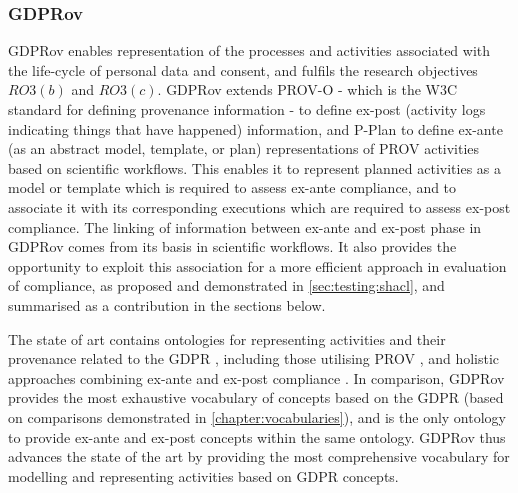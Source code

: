 \subsubsection{GDPRov}
GDPRov enables representation of the processes and activities associated with the life-cycle of personal data and consent, and  fulfils the research objectives $RO3(b)$ and $RO3(c)$.
GDPRov extends PROV-O \cite{lebo_prov-o_2013} - which is the W3C standard for defining provenance information - to define ex-post (activity logs indicating things that have happened) information, and P-Plan \cite{garijo_p-plan_2014} to define ex-ante (as an abstract model, template, or plan) representations of PROV activities based on scientific workflows.
This enables it to represent planned activities as a model or template which is required to assess ex-ante compliance, and to associate it with its corresponding executions which are required to assess ex-post compliance.
The linking of information between ex-ante and ex-post phase in GDPRov comes from its basis in scientific workflows. It also provides the opportunity to exploit this association for a more efficient approach in evaluation of compliance, as proposed and demonstrated in \autoref{sec:testing:shacl}, and summarised as a contribution in the sections below.

The state of art contains ontologies for representing activities and their provenance related to the GDPR \cite{pasquier_data_2018,palmirani_pronto_2018-1}, including those utilising PROV \cite{belhajjame_provenance_2018,bonatti_special_2018-1}, and holistic approaches combining ex-ante and ex-post compliance \cite{dullaert_d3.4_2019}.
In comparison, GDPRov provides the most exhaustive vocabulary of concepts based on the GDPR (based on comparisons demonstrated in \autoref{chapter:vocabularies}), and is the only ontology to provide ex-ante and ex-post concepts within the same ontology.
GDPRov thus advances the state of the art by providing the most comprehensive vocabulary for modelling and representing activities based on GDPR concepts.

